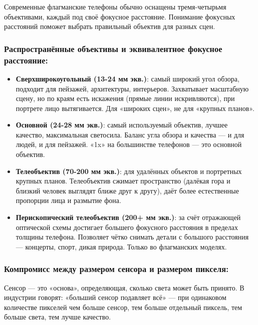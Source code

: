 
Современные флагманские телефоны обычно оснащены тремя-четырьмя объективами, каждый под своё фокусное расстояние. Понимание фокусных расстояний поможет выбрать правильный объектив для разных сцен.

\subsubsection*{Распространённые объективы и эквивалентное фокусное расстояние:}

\begin{itemize}
  \item \textbf{Сверхширокоугольный (13-24 мм экв.)}: самый широкий угол обзора, подходит для пейзажей, архитектуры, интерьеров. Захватывает масштабную сцену, но по краям есть искажения (прямые линии искривляются), при портрете лицо вытягивается. Для «широких сцен», не для «крупных планов».
  \item \textbf{Основной (24-28 мм экв.)}: самый используемый объектив, лучшее качество, максимальная светосила. Баланс угла обзора и качества — и для людей, и для пейзажей. «1x» на большинстве телефонов — это основной объектив.
  \item \textbf{Телеобъектив (70-200 мм экв.)}: для удалённых объектов и портретных крупных планов. Телеобъектив сжимает пространство (далёкая гора и близкий человек выглядят ближе друг к другу), даёт более естественные пропорции лица и размытие фона.
  \item \textbf{Перископический телеобъектив (200+ мм экв.)}: за счёт отражающей оптической схемы достигает большего фокусного расстояния в пределах толщины телефона. Позволяет чётко снимать детали с большого расстояния — концерты, спорт, дикая природа. Только во флагманских моделях.
\end{itemize}

\subsubsection*{Компромисс между размером сенсора и размером пикселя:}

Сенсор — это «основа», определяющая, сколько света может быть принято. В индустрии говорят: «больший сенсор подавляет всё» — при одинаковом количестве пикселей чем больше сенсор, тем больше отдельный пиксель, тем больше света, тем лучше качество.

